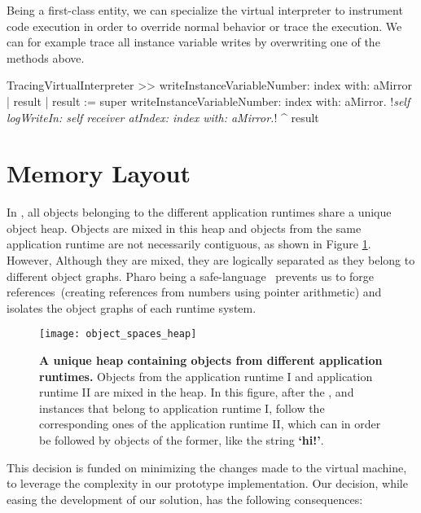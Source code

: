 Being a first-class entity, we can specialize the virtual interpreter to instrument code execution in order to override normal behavior or trace the execution. We can for example trace all instance variable writes by overwriting one of the methods above.

\begin{code}
TracingVirtualInterpreter >> writeInstanceVariableNumber: index with: aMirror
    | result |
    result := super writeInstanceVariableNumber: index with: aMirror.
    !\emph{self logWriteIn: self receiver atIndex: index with: aMirror.}!
    ^ result
\end{code}

\section{\Vtt Memory Layout} \label{sec:memory}

In \Vtt, all objects belonging to the different application runtimes share a unique object heap. Objects are mixed in this heap and objects from the same application runtime are not necessarily contiguous, as shown in Figure \ref{fig:heap}. However, Although they are mixed, they are logically separated as they belong to different object graphs. Pharo being a safe-language~\cite{Hawb98a,Hawb02a} prevents us to forge references~(\ie creating references from numbers using pointer arithmetic) and isolates the object graphs of each runtime system.

\begin{figure}[ht]
\begin{center}
\texttt{[image: object\_spaces\_heap]}
\caption{\textbf{A unique heap containing objects from different application runtimes.} Objects from the application runtime I and application runtime II are mixed in the heap. In this figure, after the ,  and  instances that belong to application runtime I, follow the corresponding ones of the application runtime II, which can in order be followed by objects of the former, like the string \textbf{`hi!'}. \label{fig:heap}}
\end{center}
\end{figure}

This decision is funded on minimizing the changes made to the virtual machine, to leverage the complexity in our prototype implementation. Our decision, while easing the development of our solution, has the following consequences:

